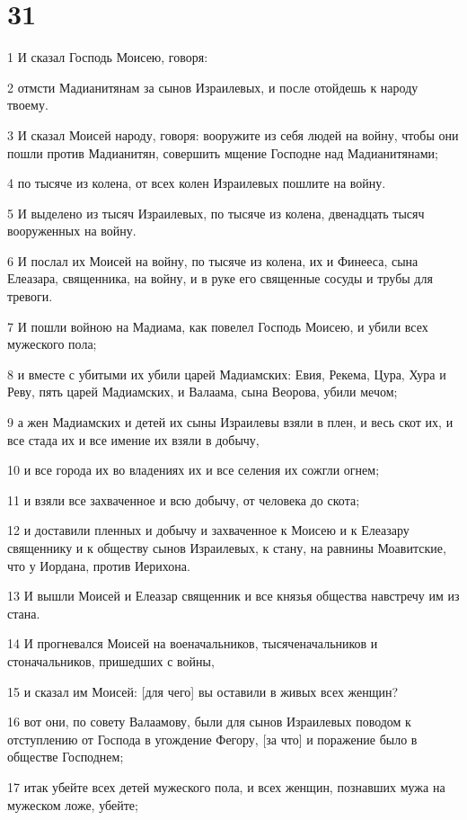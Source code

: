 \chapter{31}

\par 1 И сказал Господь Моисею, говоря:
\par 2 отмсти Мадианитянам за сынов Израилевых, и после отойдешь к народу твоему.
\par 3 И сказал Моисей народу, говоря: вооружите из себя людей на войну, чтобы они пошли против Мадианитян, совершить мщение Господне над Мадианитянами;
\par 4 по тысяче из колена, от всех колен Израилевых пошлите на войну.
\par 5 И выделено из тысяч Израилевых, по тысяче из колена, двенадцать тысяч вооруженных на войну.
\par 6 И послал их Моисей на войну, по тысяче из колена, их и Финееса, сына Елеазара, священника, на войну, и в руке его священные сосуды и трубы для тревоги.
\par 7 И пошли войною на Мадиама, как повелел Господь Моисею, и убили всех мужеского пола;
\par 8 и вместе с убитыми их убили царей Мадиамских: Евия, Рекема, Цура, Хура и Реву, пять царей Мадиамских, и Валаама, сына Веорова, убили мечом;
\par 9 а жен Мадиамских и детей их сыны Израилевы взяли в плен, и весь скот их, и все стада их и все имение их взяли в добычу,
\par 10 и все города их во владениях их и все селения их сожгли огнем;
\par 11 и взяли все захваченное и всю добычу, от человека до скота;
\par 12 и доставили пленных и добычу и захваченное к Моисею и к Елеазару священнику и к обществу сынов Израилевых, к стану, на равнины Моавитские, что у Иордана, против Иерихона.
\par 13 И вышли Моисей и Елеазар священник и все князья общества навстречу им из стана.
\par 14 И прогневался Моисей на военачальников, тысяченачальников и стоначальников, пришедших с войны,
\par 15 и сказал им Моисей: [для чего] вы оставили в живых всех женщин?
\par 16 вот они, по совету Валаамову, были для сынов Израилевых поводом к отступлению от Господа в угождение Фегору, [за что] и поражение было в обществе Господнем;
\par 17 итак убейте всех детей мужеского пола, и всех женщин, познавших мужа на мужеском ложе, убейте;
